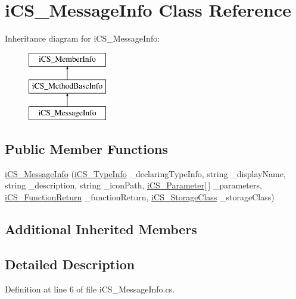 \hypertarget{classi_c_s___message_info}{\section{i\+C\+S\+\_\+\+Message\+Info Class Reference}
\label{classi_c_s___message_info}
}
Inheritance diagram for i\+C\+S\+\_\+\+Message\+Info\+:\begin{figure}[H]
\begin{center}
\leavevmode
\includegraphics[height=3.000000cm]{classi_c_s___message_info}
\end{center}
\end{figure}
\subsection*{Public Member Functions}
\begin{DoxyCompactItemize}
\item 
\hyperlink{classi_c_s___message_info_aab0de707a9cf19195ed4113c71f2f871}{i\+C\+S\+\_\+\+Message\+Info} (\hyperlink{classi_c_s___type_info}{i\+C\+S\+\_\+\+Type\+Info} \+\_\+declaring\+Type\+Info, string \+\_\+display\+Name, string \+\_\+description, string \+\_\+icon\+Path, \hyperlink{classi_c_s___parameter}{i\+C\+S\+\_\+\+Parameter}\mbox{[}$\,$\mbox{]} \+\_\+parameters, \hyperlink{classi_c_s___function_return}{i\+C\+S\+\_\+\+Function\+Return} \+\_\+function\+Return, \hyperlink{i_c_s___storage_class_8cs_a4e1bb1da155050e4b0d0118f813194aa}{i\+C\+S\+\_\+\+Storage\+Class} \+\_\+storage\+Class)
\end{DoxyCompactItemize}
\subsection*{Additional Inherited Members}


\subsection{Detailed Description}


Definition at line 6 of file i\+C\+S\+\_\+\+Message\+Info.\+cs.



